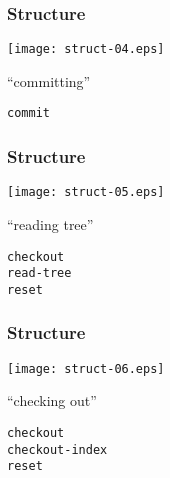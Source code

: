 \documentclass[english]{beamer}
\newcommand{\CMD}[1]{%
\texttt{\textcolor{code-green}{#1}}%
}
\begin{document}
\begin{frame}
\frametitle{Structure}

\texttt{[image: struct-04.eps]}
\vspace{\baselineskip}
\begin{center}
        ``committing''

        \vspace{\baselineskip}
        \CMD{commit}
\end{center}
\vspace{\textheight}
\end{frame}

\begin{frame}
\frametitle{Structure}

\texttt{[image: struct-05.eps]}
\vspace{\baselineskip}
\begin{center}
        ``reading tree''

        \vspace{\baselineskip}
        \CMD{checkout} \\
        \CMD{read-tree} \\
        \CMD{reset}
\end{center}
\vspace{\textheight}
\end{frame}

\begin{frame}
\frametitle{Structure}

\texttt{[image: struct-06.eps]}
\vspace{\baselineskip}
\begin{center}
        ``checking out''

        \vspace{\baselineskip}
        \CMD{checkout} \\
        \CMD{checkout-index} \\
        \CMD{reset}
\end{center}
\vspace{\textheight}
\end{frame}
\end{document}
